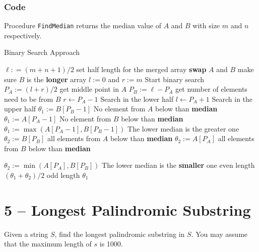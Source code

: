 \subsubsection{Code}
Procedure \texttt{FindMedian} returns the median value of $A$ and $B$ with size $m$ and $n$ respectively.
\setcounter{algorithm}{0}
\begin{algorithm}[H]
\caption{Binary Search Approach}
\begin{algorithmic}[1]
\State $\ell: = (m + n + 1)/2$ \Comment set half length for the merged array
\State \textbf{swap} $A$ and $B$ \Comment make sure $B$ is the \textbf{longer} array
\EndIf
\State $l := 0$ and $r:=m$ \Comment Start binary search
\State $P_A := (l+r)/2$ \Comment get middle point in $A$
\State $P_B := \ell - P_A$ \Comment get number of elements need to be from $B$
\State $r \gets P_A -1 $ \Comment Search in the lower half
\State $l \gets P_A +1 $ \Comment Search in the upper half
\Else
{}
\State $\theta_1 := B[P_B-1]$ \Comment No element from $A$ below than \textbf{median}
\State $\theta_1 := A[P_A-1]$ \Comment No element from $B$ below than \textbf{median}
\Else 
\State $\theta_1 := \max(A[P_A - 1], B[P_B-1])$ \Comment The lower median is the greater one
\EndIf
{}
\State $\theta_2 := B[P_B]$ \Comment all elements from $A$ below than \textbf{median}
\State $\theta_2 := A[P_A]$ \Comment all elements from $B$ below than \textbf{median}
\Else
{}
\end{algorithmic}
\end{algorithm}

\begin{algorithm}[H]
\begin{algorithmic}[1]
\State $\theta_2 := \min(A[P_A], B[P_B])$ \Comment The lower median is the \textbf{smaller} one
\EndIf
\EndIf
{} \Comment even length
\State \Return $(\theta_1 + \theta_2)/2$
\Else \Comment odd length
\State \Return $\theta_1$
\EndIf
\EndWhile
\EndProcedure
\end{algorithmic}
\end{algorithm}

\section{5 -- Longest Palindromic Substring}
Given a string $S$, find the longest palindromic substring in $S$. You may assume that the maximum length of $s$ is 1000.
